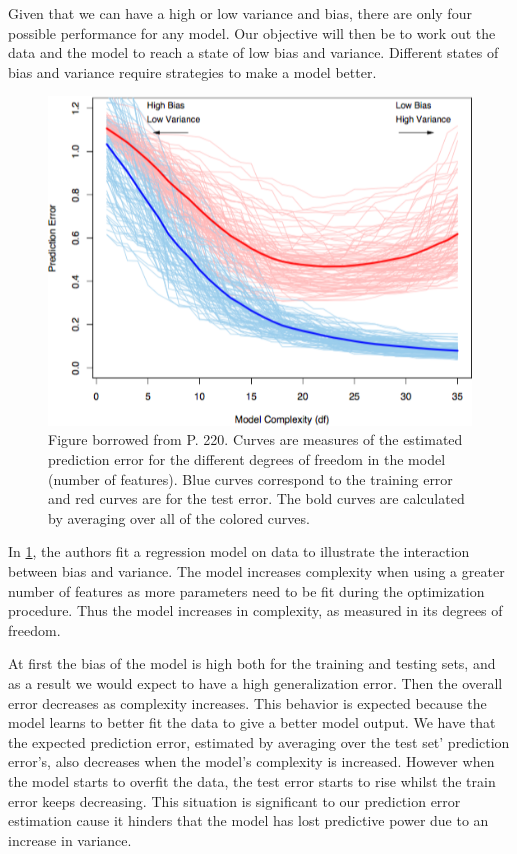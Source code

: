 Given that we can have a high or low variance and bias, there are only four possible performance for any model. Our objective will then be to work out the data and the model to reach a state of low bias and variance. Different states of bias and variance require strategies to make a model better.



\begin{figure}[h!]
\begin{center}
\includegraphics[width=0.7\columnwidth]{figures/figure-biasVariance/figure-biasVariance}
\caption{\label{figure-biasVariance} Figure borrowed from \protect\textcite{hastie-elemstatslearn} P. 220. Curves are measures of the estimated prediction error for the different degrees of freedom in the model (number of features). Blue curves correspond to the training error and red curves are for the test error. The bold curves are calculated by averaging over all of the colored curves.%
}
\end{center}
\end{figure}

In \ref{figure-biasVariance}, the authors fit a regression model on data to illustrate the interaction between bias and variance. The model increases complexity when using a greater number of features as more parameters need to be fit during the optimization procedure. Thus the model increases in complexity, as measured in its degrees of freedom.

At first the bias of the model is high both for the training and testing sets, and as a result we would expect to have a high generalization error. Then the overall error decreases as complexity increases. This behavior is expected because the model learns to better fit the data to give a better model output. We have that the expected prediction error, estimated by averaging over the test set' prediction error's, also decreases when the model's complexity is increased. However when the model starts to overfit the data, the test error starts to rise whilst the train error keeps decreasing. This situation is significant to our prediction error estimation cause it hinders that the model has lost predictive power due to an increase in variance.


